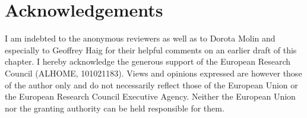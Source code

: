 \documentclass[output=paper,colorlinks,citecolor=brown,draftmode]{langscibook}
\begin{document}
\section*{Acknowledgements}
I am indebted to the anonymous reviewers as well as to Dorota Molin and especially to Geoffrey Haig for their helpful comments on an earlier draft of this chapter. I hereby acknowledge the generous support of the European Research Council (ALHOME, 101021183). Views and opinions expressed are however those of the author only and do not necessarily reflect those of the European Union or the European Research Council Executive Agency. Neither the European Union nor the granting authority can be held responsible for them.

\nocite{HaigKhan2019LLWA}

\sloppy
\printbibliography[heading=subbibliography,notkeyword=this]
\end{document}
